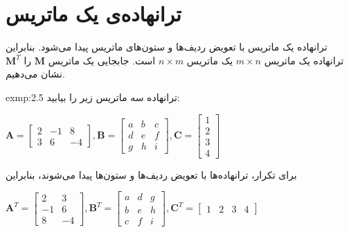 \section{\textbf{ترانهاده‌ی یک ماتریس}}
\label{sec:2.3}
{
    \Large
    \begin{spacing}{1.5}
        ترانهاده یک ماتریس با تعویض ردیف‌ها و ستون‌های ماتریس پیدا می‌شود.
        بنابراین ترانهاده یک ماتریس $m\times n$ یک ماتریس $n\times m$ است.
        جابجایی یک ماتریس $\textbf{M}$ را $\textbf{M}^T$ نشان می‌دهیم.

        \begin{exmp}{exmp:2.5}
            \Large
            ترانهاده سه ماتریس زیر را بیابید:\\

            \begin{center}
                $\textbf{A}=\begin{bmatrix}
                                2 & -1 & 8  \\
                                3 & 6  & -4
                \end{bmatrix}, \textbf{B}=\begin{bmatrix}
                                              a & b & c \\
                                              d & e & f \\
                                              g & h & i
                \end{bmatrix}, \textbf{C}=\begin{bmatrix}
                                              1 \\
                                              2 \\
                                              3 \\
                                              4
                \end{bmatrix}$
            \end{center}

            برای تکرار، ترانهاده‌ها با تعویض ردیف‌ها و ستون‌ها پیدا می‌شوند، بنابراین

            \begin{center}
                $\textbf{A}^T=\begin{bmatrix}
                                  2  & 3  \\
                                  -1 & 6  \\
                                  8  & -4
                \end{bmatrix}, \textbf{B}^T=\begin{bmatrix}
                                                a & d & g \\
                                                b & e & h \\
                                                c & f & i
                \end{bmatrix}, \textbf{C}^T=\begin{bmatrix}
                                                1 & 2 & 3 & 4
                \end{bmatrix}$
            \end{center}


\end{exmp}
\end{spacing}}
